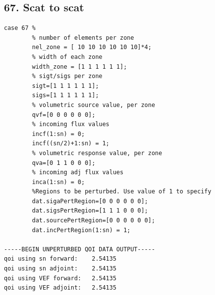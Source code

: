 \documentclass{article}
\begin{document}
\subsection{67. Scat to scat}
\begin{verbatim}
case 67 %
        % number of elements per zone
        nel_zone = [ 10 10 10 10 10 10]*4;
        % width of each zone
        width_zone = [1 1 1 1 1 1];
        % sigt/sigs per zone
        sigt=[1 1 1 1 1 1];
        sigs=[1 1 1 1 1 1];
        % volumetric source value, per zone
        qvf=[0 0 0 0 0 0];
        % incoming flux values
        incf(1:sn) = 0;
        incf((sn/2)+1:sn) = 1;
        % volumetric response value, per zone
        qva=[0 1 1 0 0 0];
        % incoming adj flux values
        inca(1:sn) = 0;
        %Regions to be perturbed. Use value of 1 to specify
        dat.sigaPertRegion=[0 0 0 0 0 0];
        dat.sigsPertRegion=[1 1 1 0 0 0];
        dat.sourcePertRegion=[0 0 0 0 0 0];
        dat.incPertRegion(1:sn) = 1; 
        
-----BEGIN UNPERTURBED QOI DATA OUTPUT----- 
qoi using sn forward: 	 2.54135 
qoi using sn adjoint: 	 2.54135 
qoi using VEF forward: 	 2.54135 
qoi using VEF adjoint: 	 2.54135 
\end{verbatim}
\end{document}
